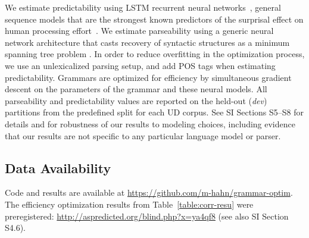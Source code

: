 \documentclass[9pt,twocolumn,twoside,lineno]{pnas-new}
\begin{document}
{We estimate predictability using LSTM recurrent neural networks~\citep{hochreiter1997long}, general sequence models that are the strongest known predictors of the surprisal effect on human processing effort~\citep{frank2011insensitivity,goodkind2018predictive}.
We estimate parseability using a generic neural network architecture that casts recovery of syntactic structures as a minimum spanning tree problem \citep{dozat2017stanford, zhang2017dependency}.
In order to reduce overfitting in the optimization process, we use an unlexicalized parsing setup, and add POS tags when estimating predictability.
Grammars are optimized for efficiency by simultaneous gradient descent on the parameters of the grammar and these neural models.
All parseability and predictability values are reported on the held-out (\emph{dev}) partitions from the predefined split for each UD corpus.
See SI Sections S5--S8 for details and for robustness of our results to modeling choices, including evidence that our results are not specific to any particular language model or parser.

\subsection*{Data Availability}
Code and results are available at \url{https://github.com/m-hahn/grammar-optim}.
The efficiency optimization results from Table~\ref{table:corr-resu} were preregistered: \url{ http://aspredicted.org/blind.php?x=ya4qf8} (see also SI Section S4.6). 
}



\showmatmethods{} %


\showacknow{} %


%

\end{document}
